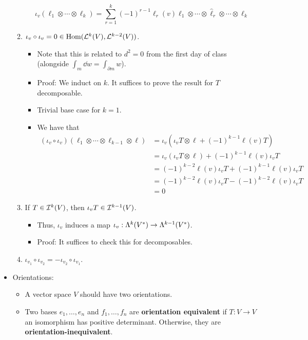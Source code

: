 \documentclass[../notes.tex]{subfiles}
\begin{document}
\begin{itemize}
\begin{enumerate}
        \begin{equation*}
            \iota_v(\ell_1\otimes\cdots\otimes\ell_k) = \sum_{r=1}^k(-1)^{r-1}\ell_r(v)\ell_1\otimes\cdots\otimes\hat{\ell}_r\otimes\cdots\otimes\ell_k
        \end{equation*}
        \item $\iota_v\circ\iota_v=0\in\Hom(\lin[k]{V},\lin[k-2]{V})$.
        \begin{itemize}
            \item Note that this is related to $d^2=0$ from the first day of class (alongside $\int_m\dd{w}=\int_{\partial m}w$).
            \item Proof: We induct on $k$. It suffices to prove the result for $T$ decomposable.
            \item Trivial base case for $k=1$.
            \item We have that
            \begin{align*}
                (\iota_v\circ\iota_v)(\ell_1\otimes\cdots\otimes\ell_{k-1}\otimes\ell) &= \iota_v(\iota_vT\otimes\ell+(-1)^{k-1}\ell(v)T)\\
                &= \iota_v(\iota_vT\otimes\ell)+(-1)^{k-1}\ell(v)\iota_vT\\
                &= (-1)^{k-2}\ell(v)\iota_vT+(-1)^{k-1}\ell(v)\iota_vT\\
                &= (-1)^{k-2}\ell(v)\iota_vT-(-1)^{k-2}\ell(v)\iota_vT\\
                &= 0
            \end{align*}
        \end{itemize}
        \item If $T\in\ide[k]{V}$, then $\iota_vT\in\ide[k-1]{V}$.
        \begin{itemize}
            \item Thus, $\iota_v$ induces a map $\iota_v:\lam[k]{V^*}\to\lam[k-1]{V^*}$.
            \item Proof: It suffices to check this for decomposables.
        \end{itemize}
        \item $\iota_{v_1}\circ\iota_{v_2}=-\iota_{v_2}\circ\iota_{v_1}$.
    \end{enumerate}
    \item Orientations:
    \begin{itemize}
        \item A vector space $V$ should have two orientations.
        \item Two bases $e_1,\dots,e_n$ and $f_1,\dots,f_n$ are \textbf{orientation equivalent} if $T:V\to V$ an isomorphism has positive determinant. Otherwise, they are \textbf{orientation-inequivalent}.

\end{itemize}
\end{itemize}
\end{document}
